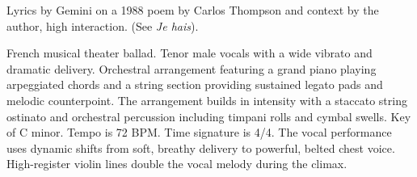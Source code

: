 

\begin{notes}
Lyrics by Gemini on a 1988 poem by Carlos Thompson and context by the author, high interaction.
(See \emph{Je hais}).
\end{notes}
\begin{style}
French musical theater ballad. %
Tenor male vocals with a wide vibrato and dramatic delivery. %
Orchestral arrangement featuring a grand piano playing arpeggiated chords and a string section providing sustained legato pads and melodic counterpoint. %
The arrangement builds in intensity with a staccato string ostinato and orchestral percussion including timpani rolls and cymbal swells. %
Key of C minor. %
Tempo is 72 BPM. %
Time signature is 4/4. %
The vocal performance uses dynamic shifts from soft, breathy delivery to powerful, belted chest voice. %
High-register violin lines double the vocal melody during the climax.
\end{style}
